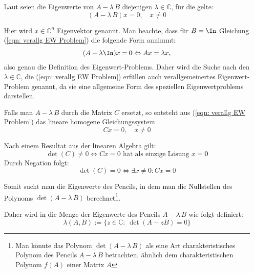 \documentclass[a4paper,12pt]{report}
\newcommand{\C}{\mathbb C}
\newcommand{\AlamB}{A-\lambda\,B}
\newcommand{\1}{\mathds{1}}
\theoremstyle{plain} %
\theoremstyle{definition} %
\newtheorem{definition}[theorem]{Definition}
\theoremstyle{remark}
\begin{document}
            Laut \cite[S. 375]{matrixGolub} seien die Eigenwerte von $\AlamB$ diejenigen $\lambda \in\C$, für die gelte:
            \begin{equation}
                  \label{eqn: verallg EW Problem}
                  (\AlamB)x=0,\quad x\ne 0
            \end{equation}
            
            Hier wird $x\in\C^n$ Eigenvektor genannt.
            Man beachte, dass für $B=\In$ Gleichung (\ref{eqn: verallg EW Problem}) die folgende Form annimmt:
            $$(A-\lambda\In)x=0 \Leftrightarrow Ax = \lambda x,$$
            also genau die Definition des Eigenwert-Problems.
            Daher wird die Suche nach den $\lambda\in\C$, die (\ref{eqn: verallg EW Problem}) erfüllen auch verallgemeinertes Eigenwert-Problem genannt, da sie eine allgemeine Form des speziellen Eigenwertproblems darstellen.

            Falls man $\AlamB$ durch die Matrix $C$ ersetzt, so entsteht aus (\ref{eqn: verallg EW Problem}) das lineare homogene Gleichungssystem
            $$Cx=0,\quad x\ne 0$$

            Nach einem Resultat aus der linearen Algebra gilt:
            $$\det(C)\ne 0 \Leftrightarrow Cx=0 \text{ hat als einzige Lösung }x=0$$
            Durch Negation folgt:
            $$\det(C)=0 \Leftrightarrow \exists x\ne 0: Cx=0$$

            Somit sucht man die Eigenwerte des Pencils, in dem man die Nullstellen des Polynoms $\det(\AlamB)$ berechnet\footnote{Man könnte das Polynom $\det(\AlamB)$ als eine Art charakteristisches Polynom des Pencils $\AlamB$ betrachten, ähnlich dem charakteristischen Polynom $f(A)$ einer Matrix $A$}.
            
            Daher wird in \cite[S. 375]{matrixGolub} die Menge der Eigenwerte des Pencils $\AlamB$ wie folgt definiert:
            \begin{equation}
                  \label{def: EW Pencil}
                  \lambda(A,B):=\{z\in\C:\ \det(A - zB) = 0\}
            \end{equation}


\end{document}
